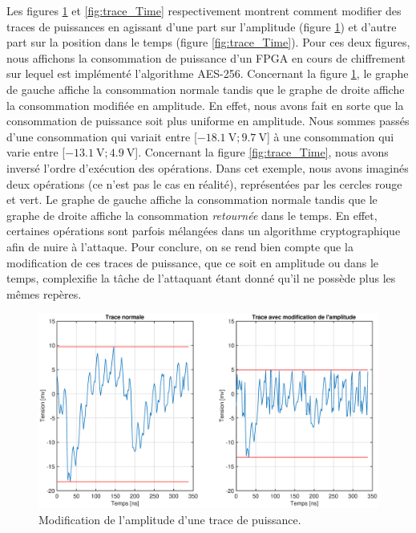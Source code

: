 \documentclass[oneside]{book}
\begin{document}
\newpage

Les figures \ref{fig:trace_Amplitude} et \ref{fig:trace_Time} respectivement montrent comment modifier des traces de puissances en agissant d'une part sur l'amplitude (figure \ref{fig:trace_Amplitude}) et d'autre part sur la position dans le temps (figure \ref{fig:trace_Time}). Pour ces deux figures, nous affichons la consommation de puissance d'un FPGA en cours de chiffrement sur lequel est implémenté l'algorithme AES-256. Concernant la figure \ref{fig:trace_Amplitude}, le graphe de gauche affiche la consommation normale tandis que le graphe de droite affiche la consommation modifiée en amplitude. En effet, nous avons fait en sorte que la consommation de puissance soit plus uniforme en amplitude. Nous sommes passés d'une consommation qui variait entre [$\SI{-18.1}{\volt} ; \SI{9.7}{\volt} $] à une consommation qui varie entre [$\SI{-13.1}{\volt} ; \SI{4.9}{\volt} $]. Concernant la figure \ref{fig:trace_Time}, nous avons inversé l'ordre d'exécution des opérations. Dans cet exemple, nous avons imaginés deux opérations (ce n'est pas le cas en réalité), représentées par les cercles rouge et vert. Le graphe de gauche affiche la consommation normale tandis que le graphe de droite affiche la consommation \textit{retournée} dans le temps. En effet, certaines opérations sont parfois mélangées dans un algorithme cryptographique afin de nuire à l'attaque. Pour conclure, on se rend bien compte que la modification de ces traces de puissance, que ce soit en amplitude ou dans le temps, complexifie la tâche de l'attaquant étant donné qu'il ne possède plus les mêmes repères.
\begin{figure}[htbp]
    \centering
    \includegraphics[scale=0.3]{image/trace_Amplitude}
    \caption{Modification de l'amplitude d'une trace de puissance.}
    \label{fig:trace_Amplitude}
\end{figure}
\end{document}
